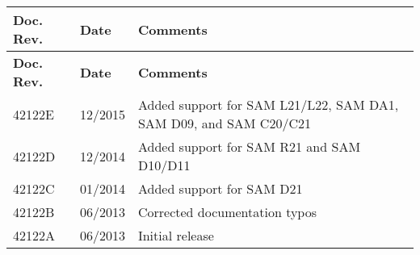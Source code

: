 \tabulinesep=1mm
\begin{longtabu}spread 0pt [c]{*{3}{|X[-1]}|}
\hline
\cellcolor{\tableheadbgcolor}\textbf{ Doc. Rev. }&\cellcolor{\tableheadbgcolor}\textbf{ Date }&\cellcolor{\tableheadbgcolor}\textbf{ Comments  }\\
\endfirsthead
\hline
\endfoot
\hline
\cellcolor{\tableheadbgcolor}\textbf{ Doc. Rev. }&\cellcolor{\tableheadbgcolor}\textbf{ Date }&\cellcolor{\tableheadbgcolor}\textbf{ Comments  }\\
\endhead
42122E &12/2015 &Added support for SAM L21/\+L22, SAM DA1, SAM D09, and SAM C20/\+C21  \\
42122D &12/2014 &Added support for SAM R21 and SAM D10/\+D11  \\
42122C &01/2014 &Added support for SAM D21  \\
42122B &06/2013 &Corrected documentation typos  \\
42122A &06/2013 &Initial release  \\
\end{longtabu}
